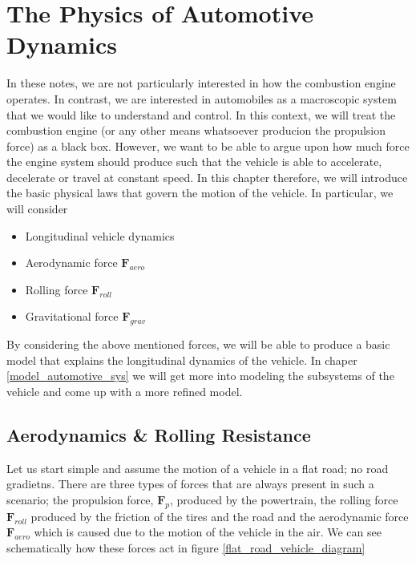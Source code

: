\chapter{The Physics of Automotive Dynamics}
\label{physics-automotive_dynamics}
In these notes, we are not particularly interested in how the combustion engine operates. In contrast, we are interested in automobiles as a macroscopic system that we would
like to understand and control. In this context, we will treat the combustion engine (or any other means whatsoever producion the propulsion force) as a black box.
However, we want to be able to argue upon how much force the engine system should produce such that the vehicle is able to accelerate, decelerate or travel at constant speed.
In this chapter therefore, we will introduce the basic physical laws that govern the motion of the vehicle. In particular, we will consider

\begin{itemize}
\item Longitudinal vehicle dynamics
\item Aerodynamic force $\mathbf{F}_{aero}$
\item Rolling force $\mathbf{F}_{roll}$
\item Gravitational force $\mathbf{F}_{grav}$
\end{itemize}

By considering the above mentioned forces, we will be able to produce a basic model that explains the longitudinal dynamics of the vehicle. In chaper \ref{model_automotive_sys} we will get more into modeling the subsystems of the vehicle and come up with a more refined model.


\section{Aerodynamics \& Rolling Resistance}

Let us start simple and assume the motion of a vehicle in a flat road; no road gradietns. There are three types of forces that are always present in such a scenario; the propulsion force, $\mathbf{F}_{p}$, produced by the  powertrain, the rolling force $\mathbf{F}_{roll}$ produced by the friction of the tires and the road and the aerodynamic force  $\mathbf{F}_{aero}$ which is caused due to the motion of the vehicle in the air. We can see schematically how these forces act in figure \ref{flat_road_vehicle_diagram}

